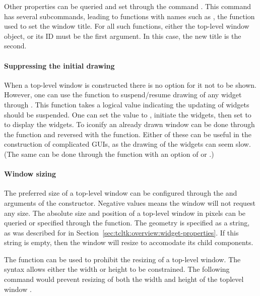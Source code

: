Other properties can be queried and set through the \TK\/ command
. This command has several subcommands, leading to
 functions with names such as , the
function used to set the window title. For all such functions,
either the top-level window object, or its ID must be the first
argument. In this case, the new title is the second.

\paragraph{Suppressing the initial drawing}
When a top-level window is constructed there is no option for it not
to be shown.  However, one can use the 
function to suspend/resume drawing of any widget through \TK. This
function takes a logical value indicating the updating of widgets
should be suspended. One can set the value to , initiate
the widgets, then set to  to display the widgets. To
iconify an already drawn window can be done through the
 function and reversed with the
 function. Either of these can be useful in
the construction of complicated GUIs, as the drawing of the widgets
can seem slow. (The same can be done through the 
function with an option of  or .)
 


\paragraph{Window sizing}

The preferred size of a top-level window can be configured through the
 and  arguments of the constructor.  Negative
values means the window will not request any size. The absolute size
and position of a top-level window in pixels can be queried or
specified through the  function. The geometry
is specified as a string, as was described for  in
Section~\ref{sec:tcltk:overview:widget-properties}. If this string is
empty, then the window will resize to accomodate its child components.

The  function can be used to prohibit the
resizing of a top-level window. The syntax allows either the width or
height to be constrained. The following command would  prevent
resizing of both the width and height of the toplevel window . 

